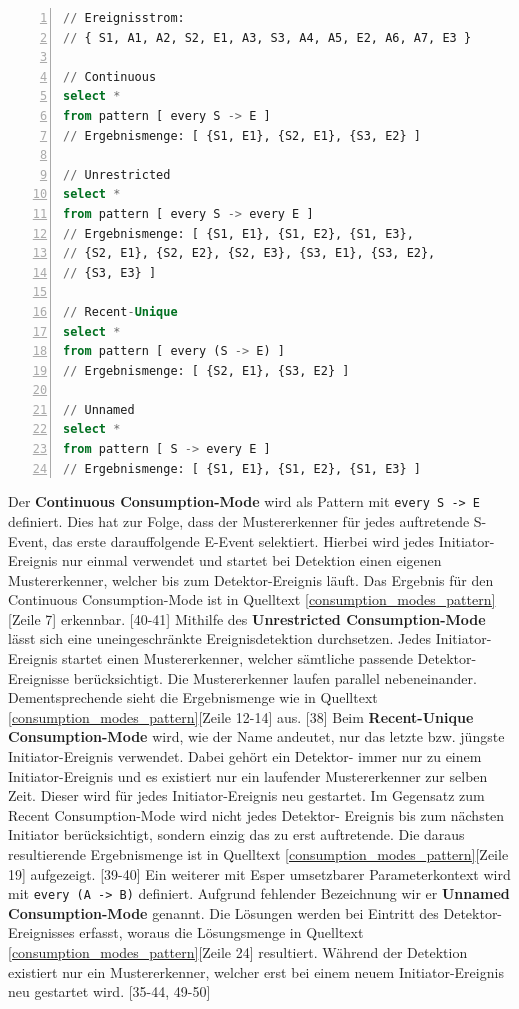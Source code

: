 \begin{lstlisting}[caption={Pattern Deklaration Consumption Modes},numbers=left,label=consumption_modes_pattern,captionpos=b,language=SQL]
// Ereignisstrom:
// { S1, A1, A2, S2, E1, A3, S3, A4, A5, E2, A6, A7, E3 }

// Continuous
select *
from pattern [ every S -> E ]
// Ergebnismenge: [ {S1, E1}, {S2, E1}, {S3, E2} ]

// Unrestricted
select *
from pattern [ every S -> every E ]
// Ergebnismenge: [ {S1, E1}, {S1, E2}, {S1, E3},
// {S2, E1}, {S2, E2}, {S2, E3}, {S3, E1}, {S3, E2},
// {S3, E3} ]

// Recent-Unique
select *
from pattern [ every (S -> E) ]
// Ergebnismenge: [ {S2, E1}, {S3, E2} ]

// Unnamed
select *
from pattern [ S -> every E ]
// Ergebnismenge: [ {S1, E1}, {S1, E2}, {S1, E3} ]

\end{lstlisting}
Der \textbf{Continuous Consumption-Mode} wird als Pattern mit \texttt{every S -> E} definiert. Dies hat zur Folge, dass der Mustererkenner für jedes auftretende S-Event, das erste darauffolgende E-Event selektiert. 
Hierbei wird jedes Initiator-Ereignis nur einmal verwendet und startet bei Detektion einen eigenen Mustererkenner, welcher bis zum Detektor-Ereignis läuft.
Das Ergebnis für den Continuous Consumption-Mode ist in Quelltext \ref{consumption_modes_pattern}[Zeile 7] erkennbar. \cite{CEP2017}[40-41]
\absatz
Mithilfe des \textbf{Unrestricted Consumption-Mode} lässt sich eine uneingeschränkte Ereignisdetektion durchsetzen. Jedes Initiator-Ereignis
startet einen Mustererkenner, welcher sämtliche passende Detektor-Ereignisse berücksichtigt. Die Mustererkenner laufen parallel nebeneinander.
Dementsprechende sieht die Ergebnismenge wie in Quelltext \ref{consumption_modes_pattern}[Zeile 12-14] aus. \cite{CEP2017}[38]
\absatz
Beim \textbf{Recent-Unique Consumption-Mode} wird,
wie der Name andeutet, nur das letzte bzw. jüngste Initiator-Ereignis verwendet. Dabei gehört ein Detektor- immer nur zu einem Initiator-Ereignis und es existiert nur ein laufender Mustererkenner zur selben Zeit. Dieser wird für jedes Initiator-Ereignis neu gestartet.
Im Gegensatz zum Recent Consumption-Mode wird nicht jedes Detektor- Ereignis bis zum nächsten Initiator berücksichtigt, sondern einzig das zu erst auftretende. Die daraus resultierende Ergebnismenge ist in Quelltext \ref{consumption_modes_pattern}[Zeile 19] aufgezeigt.
\cite{CEP2017}[39-40]
\absatz
Ein weiterer mit Esper umsetzbarer Parameterkontext wird mit \texttt{every (A -> B)} definiert.
Aufgrund fehlender Bezeichnung wir er \textbf{Unnamed Consumption-Mode} genannt.
Die Lösungen werden bei Eintritt des Detektor-Ereignisses erfasst, woraus die Lösungsmenge in Quelltext \ref{consumption_modes_pattern}[Zeile 24] resultiert.
Während der Detektion existiert nur ein Mustererkenner, welcher erst bei einem neuem Initiator-Ereignis neu gestartet wird.
\cite{CEP2017}[35-44, 49-50]

